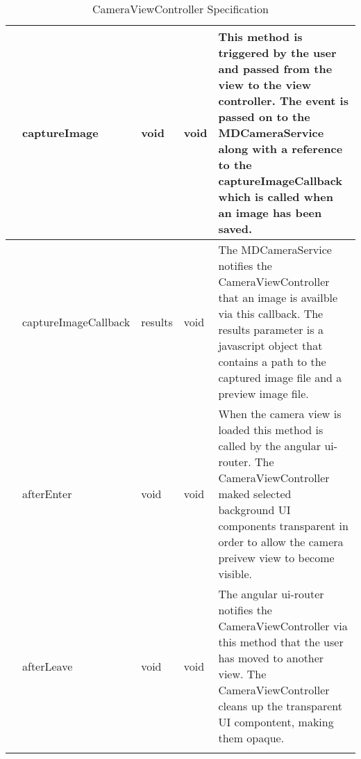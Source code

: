{\begin{longtable}[H]{  | >{\bfseries}l | p{1.5cm} | p{1.5cm} | p{1.5cm} | p{4cm} | }
        & captureImage & void & void
        & This method is triggered by the user and passed from the view to the view controller. The event is passed on to the MDCameraService along with a reference to the captureImageCallback which is called when an image has been saved.
        \\ \hline
        & captureImageCallback & results & void
        & The MDCameraService notifies the CameraViewController that an image is availble via this callback. The results parameter is a javascript object that contains a path to the captured image file and a preview image file.
        \\ \hline
        & afterEnter & void & void
        & When the camera view is loaded this method is called by the angular ui-router. The CameraViewController maked selected background UI components transparent in order to allow the camera preivew view to become visible.
        \\ \hline
        & afterLeave & void & void
        & The angular ui-router notifies the CameraViewController via this method that the user has moved to another view. The CameraViewController cleans up the transparent UI compontent, making them opaque.
        \\ \hline


    \caption{CameraViewController Specification}
    \label{fig:camera_controller}
\end{longtable}
}